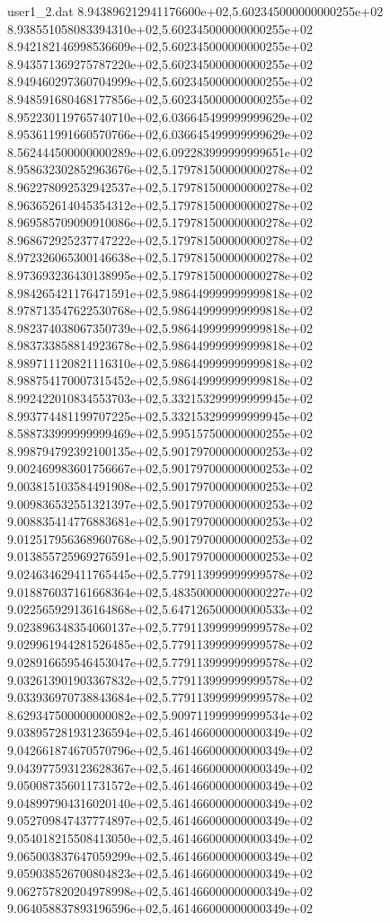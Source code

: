 \begin{filecontents}{user1_2.dat}
8.943896212941176600e+02,5.602345000000000255e+02
8.938551058083394310e+02,5.602345000000000255e+02
8.942182146998536609e+02,5.602345000000000255e+02
8.943571369275787220e+02,5.602345000000000255e+02
8.949460297360704999e+02,5.602345000000000255e+02
8.948591680468177856e+02,5.602345000000000255e+02
8.952230119765740710e+02,6.036645499999999629e+02
8.953611991660570766e+02,6.036645499999999629e+02
8.562444500000000289e+02,6.092283999999999651e+02
8.958632302852963676e+02,5.179781500000000278e+02
8.962278092532942537e+02,5.179781500000000278e+02
8.963652614045354312e+02,5.179781500000000278e+02
8.969585709090910086e+02,5.179781500000000278e+02
8.968672925237747222e+02,5.179781500000000278e+02
8.972326065300146638e+02,5.179781500000000278e+02
8.973693236430138995e+02,5.179781500000000278e+02
8.984265421176471591e+02,5.986449999999999818e+02
8.978713547622530768e+02,5.986449999999999818e+02
8.982374038067350739e+02,5.986449999999999818e+02
8.983733858814923678e+02,5.986449999999999818e+02
8.989711120821116310e+02,5.986449999999999818e+02
8.988754170007315452e+02,5.986449999999999818e+02
8.992422010834553703e+02,5.332153299999999945e+02
8.993774481199707225e+02,5.332153299999999945e+02
8.588733999999999469e+02,5.995157500000000255e+02
8.998794792392100135e+02,5.901797000000000253e+02
9.002469983601756667e+02,5.901797000000000253e+02
9.003815103584491908e+02,5.901797000000000253e+02
9.009836532551321397e+02,5.901797000000000253e+02
9.008835414776883681e+02,5.901797000000000253e+02
9.012517956368960768e+02,5.901797000000000253e+02
9.013855725969276591e+02,5.901797000000000253e+02
9.024634629411765445e+02,5.779113999999999578e+02
9.018876037161668364e+02,5.483500000000000227e+02
9.022565929136164868e+02,5.647126500000000533e+02
9.023896348354060137e+02,5.779113999999999578e+02
9.029961944281526485e+02,5.779113999999999578e+02
9.028916659546453047e+02,5.779113999999999578e+02
9.032613901903367832e+02,5.779113999999999578e+02
9.033936970738843684e+02,5.779113999999999578e+02
8.629347500000000082e+02,5.909711999999999534e+02
9.038957281931236594e+02,5.461466000000000349e+02
9.042661874670570796e+02,5.461466000000000349e+02
9.043977593123628367e+02,5.461466000000000349e+02
9.050087356011731572e+02,5.461466000000000349e+02
9.048997904316020140e+02,5.461466000000000349e+02
9.052709847437774897e+02,5.461466000000000349e+02
9.054018215508413050e+02,5.461466000000000349e+02
9.065003837647059299e+02,5.461466000000000349e+02
9.059038526700804823e+02,5.461466000000000349e+02
9.062757820204978998e+02,5.461466000000000349e+02
9.064058837893196596e+02,5.461466000000000349e+02

\end{filecontents}
